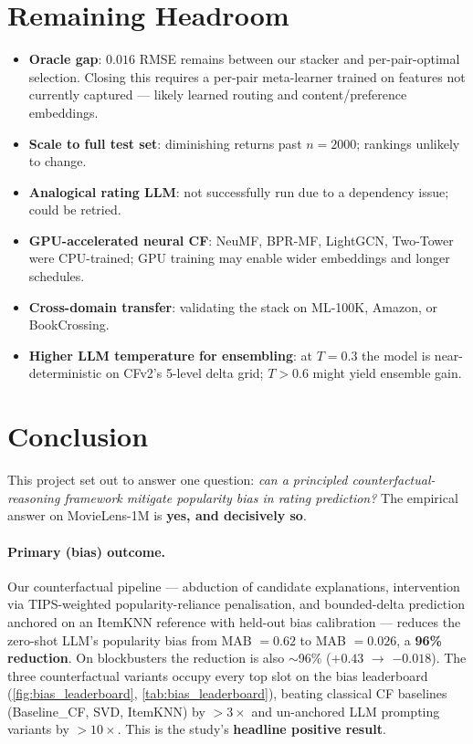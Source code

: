 \documentclass[11pt,a4paper]{article}
\begin{document}
\section{Remaining Headroom}

\begin{itemize}[leftmargin=1.5em,itemsep=1pt]
\item \textbf{Oracle gap}: $0.016$ RMSE remains between our stacker
      and per-pair-optimal selection. Closing this requires a per-pair
      meta-learner trained on features not currently captured --- likely
      learned routing and content/preference embeddings.
\item \textbf{Scale to full test set}: diminishing returns past $n=2000$;
      rankings unlikely to change.
\item \textbf{Analogical rating LLM}: not successfully run due to a
      dependency issue; could be retried.
\item \textbf{GPU-accelerated neural CF}: NeuMF, BPR-MF, LightGCN,
      Two-Tower were CPU-trained; GPU training may enable wider
      embeddings and longer schedules.
\item \textbf{Cross-domain transfer}: validating the stack on
      ML-100K, Amazon, or BookCrossing.
\item \textbf{Higher LLM temperature for ensembling}: at $T=0.3$ the
      model is near-deterministic on CFv2's 5-level delta grid;
      $T > 0.6$ might yield ensemble gain.
\end{itemize}

\section{Conclusion}

This project set out to answer one question: \emph{can a principled
counterfactual-reasoning framework mitigate popularity bias in rating
prediction?} The empirical answer on MovieLens-1M is \textbf{yes, and
decisively so}.

\paragraph{Primary (bias) outcome.} Our counterfactual pipeline ---
abduction of candidate explanations, intervention via TIPS-weighted
popularity-reliance penalisation, and bounded-delta prediction anchored
on an ItemKNN reference with held-out bias calibration --- reduces the
zero-shot LLM's popularity bias from MAB $=0.62$ to MAB $=0.026$, a
\textbf{96\% reduction}. On blockbusters the reduction is also $\sim$96\%
($+0.43$ $\to$ $-0.018$). The three counterfactual variants occupy
every top slot on the bias leaderboard (\cref{fig:bias_leaderboard},
\cref{tab:bias_leaderboard}), beating classical CF baselines
(Baseline\_CF, SVD, ItemKNN) by $>3\times$ and un-anchored LLM
prompting variants by $>10\times$. This is the study's \textbf{headline
positive result}.
\end{document}
